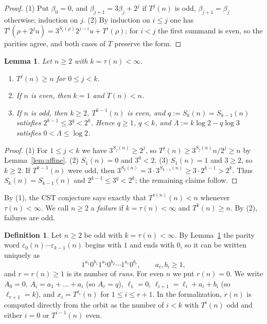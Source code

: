 \documentclass[11pt]{amsart}
\newtheorem{lemma}[theorem]{Lemma}
\theoremstyle{definition}
\newtheorem{definition}[theorem]{Definition}
\theoremstyle{remark}
\begin{document}
\begin{proof}
(1) Put $\beta_0=0$, and $\beta_{j+1}=3\beta_j+2^{j}$ if $T^{j}(n)$ is odd, $\beta_{j+1}=\beta_j$ otherwise; induction on $j$. (2) By induction on $i\le j$ one has $T^{i}(\rho+2^{j}u)=3^{S_i(\rho)}2^{j-i}u+T^{i}(\rho)$; for $i<j$ the first summand is even, so the parities agree, and both cases of $T$ preserve the form.
\end{proof}

\begin{lemma}\label{lem:before}
Let $n\ge2$ with $k=\tau(n)<\infty$.
\begin{enumerate}
\item $T^{j}(n)\ge n$ for $0\le j<k$.
\item If $n$ is even, then $k=1$ and $T(n)<n$.
\item If $n$ is odd, then $k\ge2$, $T^{k-1}(n)$ is even, and $q:=S_k(n)=S_{k-1}(n)$ satisfies $2^{k-1}\le3^{q}<2^{k}$. Hence $q\ge1$, $q<k$, and $\Lambda:=k\log2-q\log3$ satisfies $0<\Lambda\le\log2$.
\end{enumerate}
\end{lemma}

\begin{proof}
(1) For $1\le j<k$ we have $3^{S_j(n)}\ge2^{j}$, so $T^{j}(n)\ge 3^{S_j(n)}n/2^{j}\ge n$ by Lemma~\ref{lem:affine}. (2) $S_1(n)=0$ and $3^0<2$. (3) $S_1(n)=1$ and $3\ge2$, so $k\ge2$. If $T^{k-1}(n)$ were odd, then $3^{S_k(n)}=3\cdot3^{S_{k-1}(n)}\ge3\cdot2^{k-1}>2^{k}$. Thus $S_k(n)=S_{k-1}(n)$ and $2^{k-1}\le3^{q}<2^{k}$; the remaining claims follow.
\end{proof}

By (1), the CST conjecture says exactly that $T^{\tau(n)}(n)<n$ whenever $\tau(n)<\infty$. We call $n\ge2$ a \emph{failure} if $k=\tau(n)<\infty$ and $T^{k}(n)\ge n$. By (2), failures are odd.

\begin{definition}\label{def:runs}
Let $n\ge2$ be odd with $k=\tau(n)<\infty$. By Lemma~\ref{lem:before} the parity word $\varepsilon_0(n)\cdots\varepsilon_{k-1}(n)$ begins with $1$ and ends with $0$, so it can be written uniquely as
\[
1^{a_1}0^{b_1}1^{a_2}0^{b_2}\cdots1^{a_r}0^{b_r},\qquad a_i,b_i\ge1,
\]
and $r=r(n)\ge1$ is its number of \emph{runs}. For even $n$ we put $r(n)=0$. We write $A_0=0$, $A_i=a_1+\dots+a_i$ (so $A_r=q$), $\ell_1=0$, $\ell_{i+1}=\ell_i+a_i+b_i$ (so $\ell_{r+1}=k$), and $x_i=T^{\ell_i}(n)$ for $1\le i\le r+1$. In the formalization, $r(n)$ is computed directly from the orbit as the number of $i<k$ with $T^{i}(n)$ odd and either $i=0$ or $T^{i-1}(n)$ even.
\end{definition}
\end{document}
